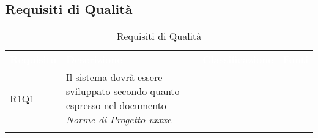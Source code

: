 \subsection{Requisiti di Qualità}


\renewcommand{\arraystretch}{1.5}
\begin{longtable}{ m{}<{\centering}  m{}<{\centering}  m{}<{\centering}  m{}<{\centering}}
	\rowcolor{darkblue}
	\textcolor{white}{\textbf{Requisito}} &\textcolor{white}{\textbf{Descrizione}}& \textcolor{white}{\textbf{Classificazione}} & \textcolor{white}{\textbf{Fonti}}\\ 

	R1Q1 & Il sistema dovrà essere sviluppato secondo quanto espresso nel documento \textit{Norme di Progetto vxxxe} & \Ob & \Di \\	
			 

	\hiderowcolors \caption{Requisiti di Qualità}
\end{longtable}

\clearpage